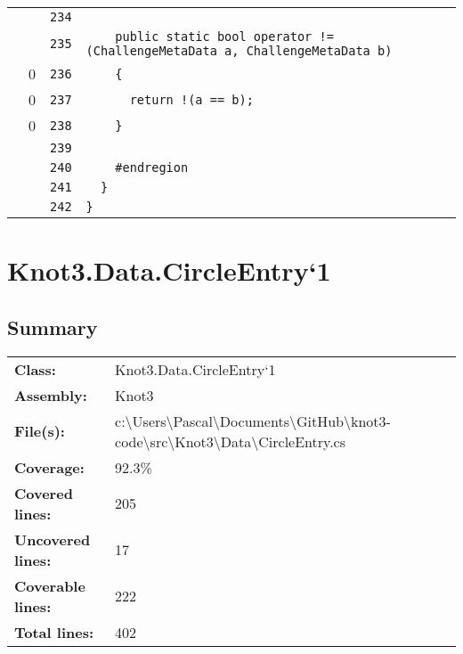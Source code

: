 \documentclass[a4paper,10pt]{article}
\begin{document}
\begin{longtable}[l]{lrrl}
\cellcolor{gray} &  & \verb~234~ & \verb~~\\
\cellcolor{gray} &  & \verb~235~ & \verb~    public static bool operator != (ChallengeMetaData a, ChallengeMetaData b)~\\
\cellcolor{red} & 0 & \verb~236~ & \verb~    {~\\
\cellcolor{red} & 0 & \verb~237~ & \verb~      return !(a == b);~\\
\cellcolor{red} & 0 & \verb~238~ & \verb~    }~\\
\cellcolor{gray} &  & \verb~239~ & \verb~~\\
\cellcolor{gray} &  & \verb~240~ & \verb~    #endregion~\\
\cellcolor{gray} &  & \verb~241~ & \verb~  }~\\
\cellcolor{gray} &  & \verb~242~ & \verb~}~\\
\end{longtable}
\newpage
\section{Knot3.Data.CircleEntry`1}
\subsection{Summary}
\begin{longtable}[l]{ll}
\textbf{Class:} & Knot3.Data.CircleEntry`1\\
\textbf{Assembly:} & Knot3\\
\textbf{File(s):} & \begin{minipage}[t]{12cm}{c:\textbackslash Users\textbackslash Pascal\textbackslash Documents\textbackslash GitHub\textbackslash knot3-code\textbackslash src\textbackslash Knot3\textbackslash Data\textbackslash CircleEntry.cs}\end{minipage} \\
\textbf{Coverage:} & 92.3\%\\
\textbf{Covered lines:} & 205\\
\textbf{Uncovered lines:} & 17\\
\textbf{Coverable lines:} & 222\\
\textbf{Total lines:} & 402\\
\end{longtable}
\end{document}
